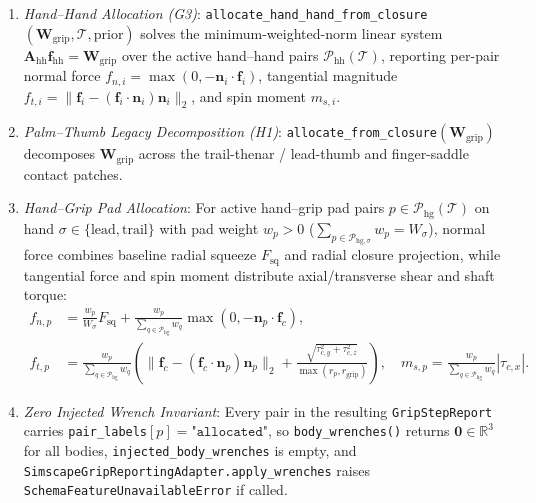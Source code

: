 \documentclass[11pt,a4paper]{article}
\begin{document}
\begin{enumerate}[leftmargin=*,noitemsep]
\item \textit{Hand--Hand Allocation (G3)}: \texttt{allocate\_hand\_hand\_from\_closure}$(\mathbf{W}_{\mathrm{grip}}, \mathcal{T}, \text{prior})$ solves the minimum-weighted-norm linear system $\mathbf{A}_{\mathrm{hh}}\mathbf{f}_{\mathrm{hh}} = \mathbf{W}_{\mathrm{grip}}$ over the active hand--hand pairs $\mathcal{P}_{\mathrm{hh}}(\mathcal{T})$, reporting per-pair normal force $f_{n,i} = \max(0, -\mathbf{n}_i \cdot \mathbf{f}_i)$, tangential magnitude $f_{t,i} = \|\mathbf{f}_i - (\mathbf{f}_i \cdot \mathbf{n}_i)\mathbf{n}_i\|_2$, and spin moment $m_{s,i}$.
\item \textit{Palm--Thumb Legacy Decomposition (H1)}: \texttt{allocate\_from\_closure}$(\mathbf{W}_{\mathrm{grip}})$ decomposes $\mathbf{W}_{\mathrm{grip}}$ across the trail-thenar / lead-thumb and finger-saddle contact patches.
\item \textit{Hand--Grip Pad Allocation}: For active hand--grip pad pairs $p \in \mathcal{P}_{\mathrm{hg}}(\mathcal{T})$ on hand $\sigma \in \{\text{lead}, \text{trail}\}$ with pad weight $w_p > 0$ ($\sum_{p \in \mathcal{P}_{\mathrm{hg},\sigma}} w_p = W_\sigma$), normal force combines baseline radial squeeze $F_{\mathrm{sq}}$ and radial closure projection, while tangential force and spin moment distribute axial/transverse shear and shaft torque:
\begin{align}
f_{n,p} &= \frac{w_p}{W_\sigma} F_{\mathrm{sq}} + \frac{w_p}{\sum_{q \in \mathcal{P}_{\mathrm{hg}}} w_q} \max\!\left(0, -\mathbf{n}_p \cdot \mathbf{f}_c\right), \\
f_{t,p} &= \frac{w_p}{\sum_{q \in \mathcal{P}_{\mathrm{hg}}} w_q} \left( \|\mathbf{f}_c - (\mathbf{f}_c \cdot \mathbf{n}_p)\mathbf{n}_p\|_2 + \frac{\sqrt{\tau_{c,y}^2 + \tau_{c,z}^2}}{\max(r_p, r_{\mathrm{grip}})} \right), \quad
m_{s,p} = \frac{w_p}{\sum_{q \in \mathcal{P}_{\mathrm{hg}}} w_q} |\tau_{c,x}|.
\end{align}
\item \textit{Zero Injected Wrench Invariant}: Every pair in the resulting \texttt{GripStepReport} carries \texttt{pair\_labels}$[p] = \texttt{"allocated"}$, so \texttt{body\_wrenches()} returns $\mathbf{0} \in \mathbb{R}^3$ for all bodies, \texttt{injected\_body\_wrenches} is empty, and \texttt{SimscapeGripReportingAdapter.apply\_wrenches} raises \texttt{SchemaFeatureUnavailableError} if called.
\end{enumerate}
\end{document}
